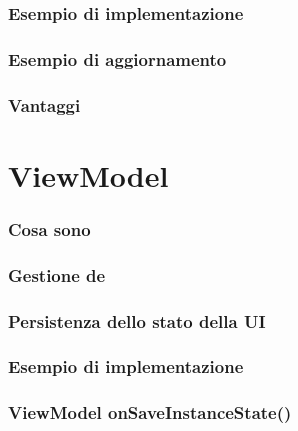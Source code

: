 \subsubsection{Esempio di implementazione}

\subsubsection{Esempio di aggiornamento}

\subsubsection{Vantaggi}

\section{ViewModel}
\subsubsection{Cosa sono}

\subsubsection{Gestione de}

\subsubsection{Persistenza dello stato della UI}

\subsubsection{Esempio di implementazione}

\subsubsection{ViewModel onSaveInstanceState()}


